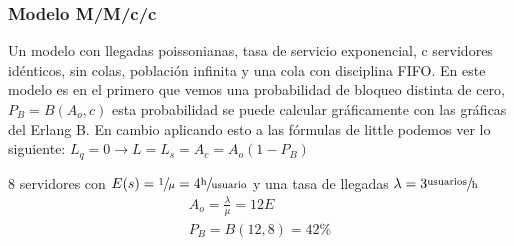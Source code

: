 \subsubsection{Modelo M/M/c/c}
Un modelo con llegadas poissonianas, tasa de servicio exponencial, c servidores idénticos, sin colas, población infinita y una cola con disciplina FIFO. En este modelo es en el primero que vemos una probabilidad de bloqueo distinta de cero, $P_B=B(A_o,c)$ esta probabilidad se puede calcular gráficamente con las gráficas del Erlang B. En cambio aplicando esto a las fórmulas de little podemos ver lo siguiente: $L_q=0\to L=L_s=A_c=A_o(1-P_B)$\\
\begin{example}[M/M/c/c]
8 servidores con $E(s)=\sfrac{1}{\mu}=4\sfrac{\text{h}}{\text{usuario}}$ y una tasa de llegadas $\lambda=3\sfrac{\text{usuarios}}{\text{h}}$\\
\begin{gather*}
A_o=\frac{\lambda}{\mu}=12E\\
P_B=B(12,8)=42\%
\end{gather*}
\end{example}
